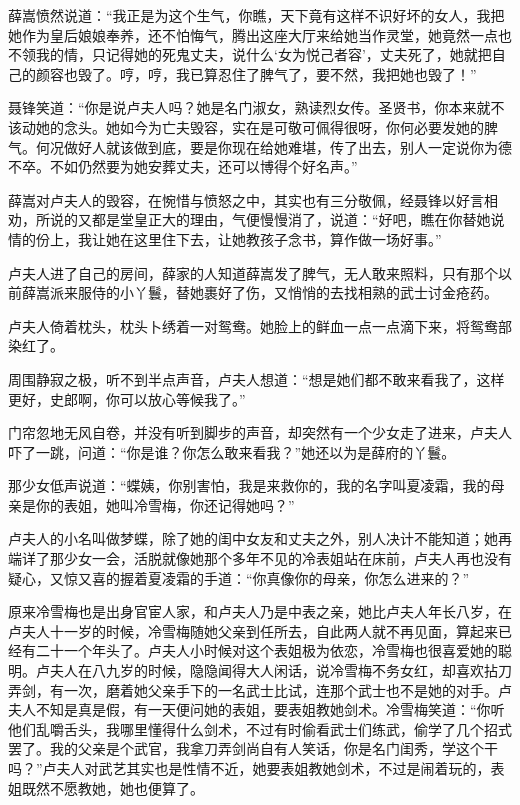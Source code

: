 \documentclass[12pt,oneside]{book}
\begin{document}
薛嵩愤然说道：``我正是为这个生气，你瞧，天下竟有这样不识好坏的女人，我把她作为皇后娘娘奉养，还不怕悔气，腾出这座大厅来给她当作灵堂，她竟然一点也不领我的情，只记得她的死鬼丈夫，说什么`女为悦己者容'，丈夫死了，她就把自己的颜容也毁了。哼，哼，我已算忍住了脾气了，要不然，我把她也毁了！''

聂锋笑道：``你是说卢夫人吗？她是名门淑女，熟读烈女传。圣贤书，你本来就不该动她的念头。她如今为亡夫毁容，实在是可敬可佩得很呀，你何必要发她的脾气。何况做好人就该做到底，要是你现在给她难堪，传了出去，别人一定说你为德不卒。不如仍然要为她安葬丈夫，还可以博得个好名声。''

薛嵩对卢夫人的毁容，在惋惜与愤怒之中，其实也有三分敬佩，经聂锋以好言相劝，所说的又都是堂皇正大的理由，气便慢慢消了，说道：``好吧，瞧在你替她说情的份上，我让她在这里住下去，让她教孩子念书，算作做一场好事。''

卢夫人进了自己的房间，薛家的人知道薛嵩发了脾气，无人敢来照料，只有那个以前薛嵩派来服侍的小丫鬟，替她裹好了伤，又悄悄的去找相熟的武士讨金疮药。

卢夫人倚着枕头，枕头卜绣着一对鸳鸯。她脸上的鲜血一点一点滴下来，将鸳鸯部染红了。

周围静寂之极，听不到半点声音，卢夫人想道：``想是她们都不敢来看我了，这样更好，史郎啊，你可以放心等候我了。''

门帘忽地无风自卷，并没有听到脚步的声音，却突然有一个少女走了进来，卢夫人吓了一跳，问道：``你是谁？你怎么敢来看我？''她还以为是薛府的丫鬟。

那少女低声说道：``蝶姨，你别害怕，我是来救你的，我的名字叫夏凌霜，我的母亲是你的表姐，她叫冷雪梅，你还记得她吗？''

卢夫人的小名叫做梦蝶，除了她的闺中女友和丈夫之外，别人决计不能知道；她再端详了那少女一会，活脱就像她那个多年不见的冷表姐站在床前，卢夫人再也没有疑心，又惊又喜的握着夏凌霜的手道：``你真像你的母亲，你怎么进来的？''

原来冷雪梅也是出身官宦人家，和卢夫人乃是中表之亲，她比卢夫人年长八岁，在卢夫人十一岁的时候，冷雪梅随她父亲到任所去，自此两人就不再见面，算起来已经有二十一个年头了。卢夫人小时候对这个表姐极为依恋，冷雪梅也很喜爱她的聪明。卢夫人在八九岁的时候，隐隐闻得大人闲话，说冷雪梅不务女红，却喜欢拈刀弄剑，有一次，磨着她父亲手下的一名武士比试，连那个武士也不是她的对手。卢夫人不知是真是假，有一天便问她的表姐，要表姐教她剑术。冷雪梅笑道：``你听他们乱嚼舌头，我哪里懂得什么剑术，不过有时偷看武士们练武，偷学了几个招式罢了。我的父亲是个武官，我拿刀弄剑尚自有人笑话，你是名门闺秀，学这个干吗？''卢夫人对武艺其实也是性情不近，她要表姐教她剑术，不过是闹着玩的，表姐既然不愿教她，她也便算了。
\end{document}
